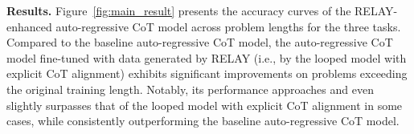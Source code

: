 


\textbf{Results.} Figure~\ref{fig:main_result} presents the accuracy curves of the 
RELAY-enhanced auto-regressive CoT model 
across problem lengths for the three tasks. Compared to the baseline auto-regressive CoT model, the auto-regressive CoT model fine-tuned with data generated by RELAY (i.e., by the looped model with explicit CoT alignment) exhibits significant improvements on problems exceeding the original training length. Notably, its performance approaches and even slightly surpasses that of the looped model with explicit CoT alignment in some cases, while consistently outperforming the baseline auto-regressive CoT model.

